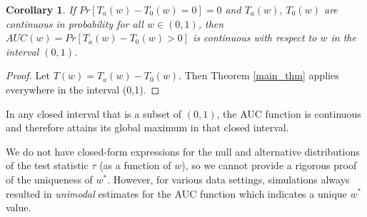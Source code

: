 \documentclass[12pt]{article} %
\newtheorem{cor}{Corollary}
\begin{document}
\begin{cor}{
 If $Pr[T_a(w)-T_0(w)=0]=0$ and $T_a(w)$, $T_0(w)$ are continuous in probability for all $w \in (0,1)$, then $AUC(w)=Pr\left[T_a(w)-T_0(w) >0 \right]$ is continuous with respect to $w$  in the interval $(0,1)$.}
\end{cor}
\begin{proof}

Let $T(w)=T_a(w)-T_0(w).$ Then Theorem \ref{main_thm} applies everywhere in the interval (0,1).
\end{proof}

In any closed interval that is a subset of $(0,1)$, the AUC function is continuous and therefore attains its global maximum in that closed interval.

 We do not have closed-form expressions for the null and alternative distributions of the test statistic $\tau$ (as a function of  $w$), so we cannot provide a rigorous proof of the uniqueness of $w^*$. However, for various data settings, simulations always resulted in \emph{unimodal}  estimates for the AUC function which indicates a unique $w^*$ value.
\end{document}
